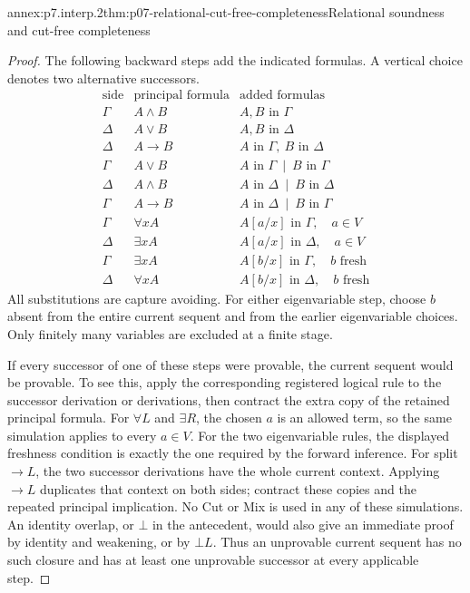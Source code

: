 \begin{annexitem}{annex:p7.interp.2}{thm:p07-relational-cut-free-completeness}{Relational soundness and cut-free completeness}
\begin{proof}
The following backward steps add the indicated formulas.  A vertical
choice denotes two alternative successors.
\[
\begin{array}{c|c|l}
 \text{side}&\text{principal formula}&\text{added formulas}\\ \hline
 \Gamma&A\land B&A,B\text{ in }\Gamma\\
 \Delta&A\lor B&A,B\text{ in }\Delta\\
 \Delta&A\to B&A\text{ in }\Gamma,\ B\text{ in }\Delta\\
 \Gamma&A\lor B&A\text{ in }\Gamma\ \mid\ B\text{ in }\Gamma\\
 \Delta&A\land B&A\text{ in }\Delta\ \mid\ B\text{ in }\Delta\\
 \Gamma&A\to B&A\text{ in }\Delta\ \mid\ B\text{ in }\Gamma\\
 \Gamma&\forall xA&A[a/x]\text{ in }\Gamma,\quad a\in V\\
 \Delta&\exists xA&A[a/x]\text{ in }\Delta,\quad a\in V\\
 \Gamma&\exists xA&A[b/x]\text{ in }\Gamma,\quad b\text{ fresh}\\
 \Delta&\forall xA&A[b/x]\text{ in }\Delta,\quad b\text{ fresh}
\end{array}
\]
All substitutions are capture avoiding.
For either eigenvariable step, choose \(b\) absent from the entire
current sequent and from the earlier eigenvariable choices.
Only finitely many variables are excluded at a finite stage.

If every successor of one of these steps were provable, the current
sequent would be provable.  To see this, apply the corresponding
registered logical rule to the successor derivation or derivations,
then contract the extra copy of the retained principal formula.
For \(\forall L\) and \(\exists R\), the chosen \(a\) is an allowed
term, so the same simulation applies to every \(a\in V\).
For the two eigenvariable rules, the displayed freshness condition
is exactly the one required by the forward inference.
For split \(\to L\), the two successor derivations have the whole
current context.  Applying \(\to L\) duplicates that context on both
sides; contract these copies and the repeated principal implication.
No Cut or Mix is used in any of these simulations.
An identity overlap, or \(\bot\) in the antecedent, would also give
an immediate proof by identity and weakening, or by \(\bot L\).
Thus an unprovable current sequent has no such closure and has at
least one unprovable successor at every applicable step.


\end{proof}
\end{annexitem}
